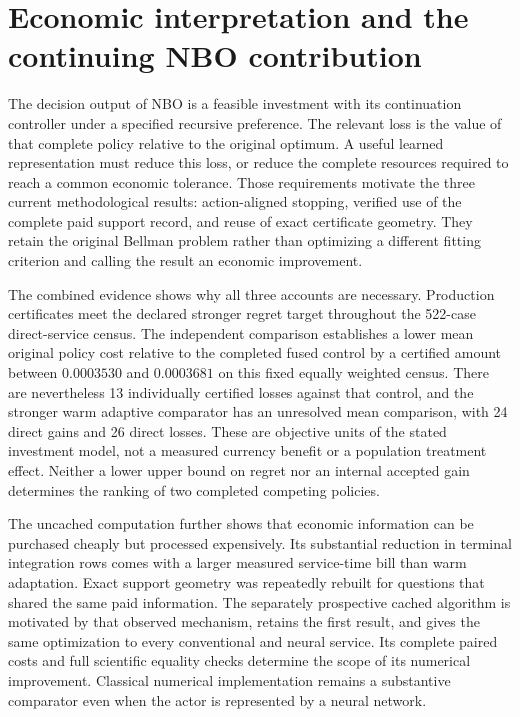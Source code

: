 \section{Economic interpretation and the continuing NBO contribution}\label{sec:discussion126}

The decision output of NBO is a feasible investment with its continuation
controller under a specified recursive preference. The relevant loss is the
value of that complete policy relative to the original optimum. A useful
learned representation must reduce this loss, or reduce the complete resources
required to reach a common economic tolerance. Those requirements motivate the
three current methodological results: action-aligned stopping, verified use of
the complete paid support record, and reuse of exact certificate geometry.
They retain the original Bellman problem rather than optimizing a different
fitting criterion and calling the result an economic improvement.

The combined evidence shows why all three accounts are necessary.
Production certificates meet the declared stronger regret target throughout the
522-case direct-service census. The independent comparison establishes a lower
mean original policy cost relative to
the completed fused control by a certified amount between $0.0003530$ and
$0.0003681$ on this fixed equally weighted census. There are nevertheless 13
individually certified losses against that control, and the stronger warm
adaptive comparator has an unresolved mean comparison, with 24 direct gains
and 26 direct losses. These are objective units of the stated investment model,
not a measured currency benefit or a population treatment effect. Neither a
lower upper bound on regret nor an internal accepted gain determines the
ranking of two completed competing policies.

The uncached computation further shows that economic information can be
purchased cheaply but processed expensively. Its substantial reduction in
terminal integration rows comes with a larger measured service-time bill than
warm adaptation. Exact support geometry was repeatedly rebuilt for questions
that shared the same paid information. The separately prospective cached
algorithm is motivated by that observed mechanism, retains the first result,
and gives the same optimization to every conventional and neural service.
Its complete paired costs and full scientific equality checks determine the
scope of its numerical improvement. Classical numerical implementation remains
a substantive comparator even when the actor is represented by a neural network.


